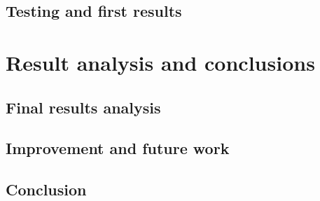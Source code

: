 \documentclass[11pt,a4paper]{article}
\begin{document}
\subsection{Testing and first results}

\section{Result analysis and conclusions}
\subsection{Final results analysis}
\subsection{Improvement and future work}
\subsection{Conclusion}




\end{document}
